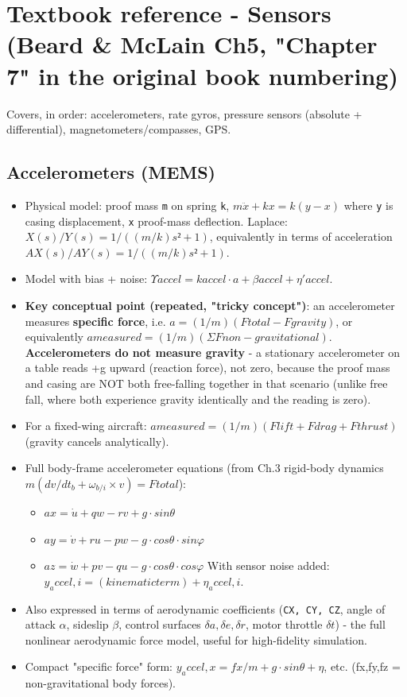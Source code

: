 \documentclass[11pt]{article}
\begin{document}
\section{Textbook reference - Sensors (Beard \& McLain Ch5, "Chapter 7" in the original book numbering)}

Covers, in order: accelerometers, rate gyros, pressure sensors (absolute + differential), magnetometers/compasses, GPS.

\subsection{Accelerometers (MEMS)}
\begin{itemize}
\item Physical model: proof mass \texttt{m} on spring \texttt{k}, $m\ddot{x} + kx = k(y-x)$ where \texttt{y} is casing displacement, \texttt{x} proof-mass deflection. Laplace: $X(s)/Y(s) = 1/((m/k)s²+1)$, equivalently in terms of acceleration $AX(s)/AY(s) = 1/((m/k)s²+1)$.
\item Model with bias + noise: $Υaccel = kaccel·a + βaccel + η'accel$.
\item \textbf{Key conceptual point (repeated, "tricky concept")}: an accelerometer measures \textbf{specific force}, i.e. $a = (1/m)(Ftotal - Fgravity)$, or equivalently $ameasured = (1/m)(ΣFnon-gravitational)$. \textbf{Accelerometers do not measure gravity} - a stationary accelerometer on a table reads +g upward (reaction force), not zero, because the proof mass and casing are NOT both free-falling together in that scenario (unlike free fall, where both experience gravity identically and the reading is zero).
\item For a fixed-wing aircraft: $ameasured = (1/m)(Flift + Fdrag + Fthrust)$ (gravity cancels analytically).
\item Full body-frame accelerometer equations (from Ch.3 rigid-body dynamics $m(dv/dt_b + ω_{b/i}×v) = Ftotal$):
\begin{itemize}
\item $ax = \dot{u} + qw - rv + g·sinθ$
\item $ay = \dot{v} + ru - pw - g·cosθ·sinφ$
\item $az = \dot{w} + pv - qu - g·cosθ·cosφ$
With sensor noise added: $y_accel,i = (kinematic term) + η_accel,i$.
\end{itemize}
\item Also expressed in terms of aerodynamic coefficients (\texttt{CX, CY, CZ}, angle of attack $α$, sideslip $β$, control surfaces $δa, δe, δr$, motor throttle $δt$) - the full nonlinear aerodynamic force model, useful for high-fidelity simulation.
\item Compact "specific force" form: $y_accel,x = fx/m + g·sinθ + η$, etc. (fx,fy,fz = non-gravitational body forces).
\end{itemize}
\end{document}
